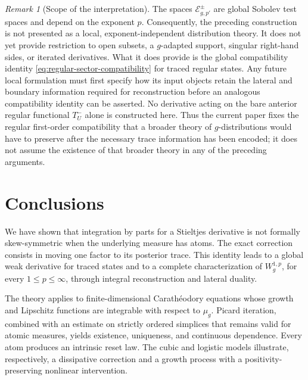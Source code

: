 \documentclass[preprint,12pt]{elsarticle}
\newenvironment{finalrevision}{\begingroup\color{red}}{\endgroup}
\newenvironment{finalrevision}{}{}
\theoremstyle{definition}
\theoremstyle{remark}
\newtheorem{remark}[theorem]{Remark}
\begin{document}
\begin{remark}[Scope of the interpretation]\label{rem:scope-prospective-distributions}
The spaces $\mathcal E_{g,p'}^\pm$ are global Sobolev test spaces and depend on the exponent $p$. Consequently, the preceding construction is not presented as a local, exponent-independent distribution theory. It does not yet provide restriction to open subsets, a $g$-adapted support, singular right-hand sides, or iterated derivatives. \begin{finalrevision}
What it does provide is the global compatibility identity
\eqref{eq:regular-sector-compatibility} for traced regular states. Any future
local formulation must first specify how its input objects retain the lateral
and boundary information required for reconstruction before an analogous
compatibility identity can be asserted. No derivative acting on the bare
anterior regular functional \(T_U^-\) alone is constructed here. Thus the
current paper fixes the regular first-order compatibility that a broader theory
of \(g\)-distributions would have to preserve after the necessary trace
information has been encoded; it does not assume the existence of that broader
theory in any of the preceding arguments.
\end{finalrevision}
\end{remark}

\section{Conclusions}

We have shown that integration by parts for a Stieltjes derivative is not formally skew-symmetric when the underlying measure has atoms. The exact correction consists in moving one factor to its posterior trace. This identity leads to a global weak derivative for traced states and to a complete characterization of $W_g^{1,p}$, for every $1\le p\le\infty$, through integral reconstruction and lateral duality.

The theory applies to finite-dimensional Carath\'eodory equations whose growth and Lipschitz functions are integrable with respect to $\mu_g$. Picard iteration, combined with an estimate on strictly ordered simplices that remains valid for atomic measures, yields existence, uniqueness, and continuous dependence. Every atom produces an intrinsic reset law. The cubic and logistic models illustrate, respectively, a dissipative correction and a growth process with a positivity-preserving nonlinear intervention.
\end{document}

